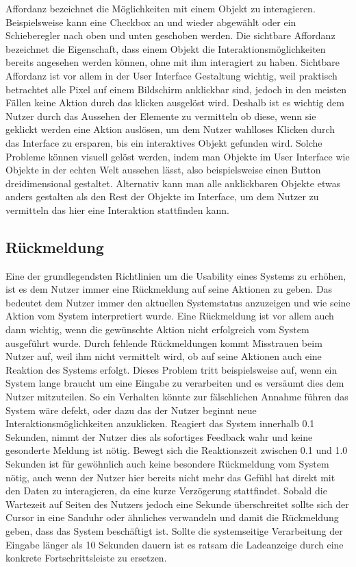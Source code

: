 Affordanz bezeichnet die Möglichkeiten mit einem Objekt zu interagieren. Beispielsweise kann eine Checkbox an und wieder abgewählt oder ein Schieberegler nach oben und unten geschoben werden.
Die sichtbare Affordanz bezeichnet die Eigenschaft, dass einem Objekt die Interaktionsmöglichkeiten bereits angesehen werden können, ohne mit ihm interagiert zu haben.
Sichtbare Affordanz ist vor allem in der User Interface Gestaltung wichtig, weil praktisch betrachtet alle Pixel auf einem Bildschirm anklickbar sind, jedoch in den meisten Fällen keine Aktion durch das klicken ausgelöst wird.
Deshalb ist es wichtig dem Nutzer durch das Aussehen der Elemente zu vermitteln ob diese, wenn sie geklickt werden eine Aktion auslösen, um dem Nutzer wahlloses Klicken durch das Interface zu ersparen, bis ein interaktives Objekt gefunden wird.
Solche Probleme können visuell gelöst werden, indem man Objekte im User Interface wie Objekte in der echten Welt aussehen lässt, also beispielsweise einen Button dreidimensional gestaltet.
Alternativ kann man alle anklickbaren Objekte etwas anders gestalten als den Rest der Objekte im Interface, um dem Nutzer zu vermitteln das hier eine Interaktion stattfinden kann\cite{Knight.2019c}.

\subsection*{Rückmeldung}

Eine der grundlegendsten Richtlinien um die Usability eines Systems zu erhöhen, ist es dem Nutzer immer eine Rückmeldung auf seine Aktionen zu geben.
Das bedeutet dem Nutzer immer den aktuellen Systemstatus anzuzeigen und wie seine Aktion vom System interpretiert wurde.
Eine Rückmeldung ist vor allem auch dann wichtig, wenn die gewünschte Aktion nicht erfolgreich vom System ausgeführt wurde.
Durch fehlende Rückmeldungen kommt Misstrauen beim Nutzer auf, weil ihm nicht vermittelt wird, ob auf seine Aktionen auch eine Reaktion des Systems erfolgt\cite{Knight.2019c}.
Dieses Problem tritt beispielsweise auf, wenn ein System lange braucht um eine Eingabe zu verarbeiten und es versäumt dies dem Nutzer mitzuteilen.
So ein Verhalten könnte zur fälschlichen Annahme führen das System wäre defekt, oder dazu das der Nutzer beginnt neue Interaktionsmöglichkeiten anzuklicken.
Reagiert das System innerhalb 0.1 Sekunden, nimmt der Nutzer dies als sofortiges Feedback wahr und keine gesonderte Meldung ist nötig.
Bewegt sich die Reaktionszeit zwischen 0.1 und 1.0 Sekunden ist für gewöhnlich auch keine besondere Rückmeldung vom System nötig, auch wenn der Nutzer hier bereits nicht mehr das Gefühl hat direkt mit den Daten zu interagieren, da eine kurze Verzögerung stattfindet.
Sobald die Wartezeit auf Seiten des Nutzers jedoch eine Sekunde überschreitet sollte sich der Cursor in eine Sanduhr oder ähnliches verwandeln und damit die Rückmeldung geben, dass das System beschäftigt ist.
Sollte die systemseitige Verarbeitung der Eingabe länger als 10 Sekunden dauern ist es ratsam die Ladeanzeige durch eine konkrete Fortschrittsleiste zu ersetzen\cite{Nielsen.1995?}.

